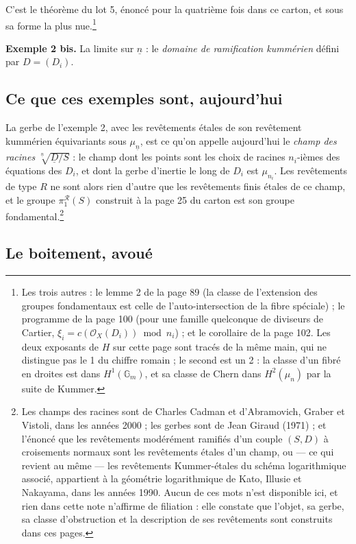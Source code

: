 \documentclass[11pt,a4paper]{article}
\begin{document}
C'est le théorème du lot 5, énoncé pour la quatrième fois dans ce carton, et
sous sa forme la plus nue.\footnote{Les trois autres : le lemme 2 de la page 89
(la classe de l'extension des groupes fondamentaux est celle de
l'auto-intersection de la fibre spéciale) ; le programme de la page 100 (pour
une famille quelconque de diviseurs de Cartier, $\xi_{i} =
c(\mathcal{O}_{X}(D_{i})) \bmod n_{i}$) ; et le corollaire de la page 102. Les
deux exposants de $H$ sur cette page sont tracés de la même main, qui ne
distingue pas le 1 du chiffre romain ; le second est un 2 : la classe d'un
fibré en droites est dans $H^{1}(\mathbb{G}_{m})$, et sa classe de Chern dans
$H^{2}(\mu_{n})$ par la suite de Kummer.}

\textbf{Exemple 2 bis.} La limite sur $\underline{n}$ : le \emph{domaine de
ramification kummérien} défini par $D = (D_{i})$.

\subsection*{Ce que ces exemples sont, aujourd'hui}

La gerbe de l'exemple 2, avec les revêtements étales de son revêtement
kummérien équivariants sous $\mu_{\underline{n}}$, est ce qu'on appelle
aujourd'hui le \emph{champ des racines}
$\sqrt[\underline{n}]{\underline{D}/S}$ : le champ dont les points sont les
choix de racines $n_{i}$-ièmes des équations des $D_{i}$, et dont la gerbe
d'inertie le long de $D_{i}$ est $\mu_{n_{i}}$. Les revêtements de type $R$ ne
sont alors rien d'autre que les revêtements finis étales de ce champ, et le
groupe $\pi_{1}^{\mathcal{R}}(S)$ construit à la page 25 du carton est son
groupe fondamental.\footnote{Les champs des racines sont de Charles Cadman et
d'Abramovich, Graber et Vistoli, dans les années 2000 ; les gerbes sont de Jean
Giraud (1971) ; et l'énoncé que les revêtements modérément ramifiés d'un couple
$(S, D)$ à croisements normaux sont les revêtements étales d'un champ, ou
--- ce qui revient au même --- les revêtements Kummer-étales du schéma
logarithmique associé, appartient à la géométrie logarithmique de Kato, Illusie
et Nakayama, dans les années 1990. Aucun de ces mots n'est disponible ici, et
rien dans cette note n'affirme de filiation : elle constate que l'objet, sa
gerbe, sa classe d'obstruction et la description de ses revêtements sont
construits dans ces pages.}

\subsection*{Le boitement, avoué}
\end{document}
